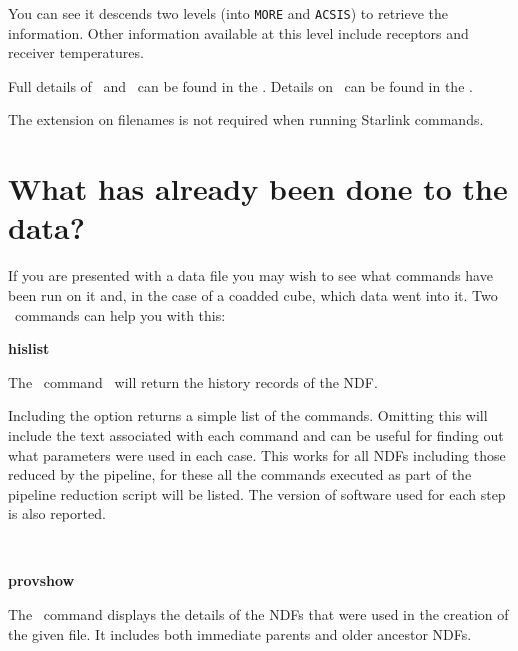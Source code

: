 \documentclass[11pt,oneside,chapters]{starlink}
\begin{document}
You can see it descends two levels (into \texttt{MORE} and
\texttt{ACSIS}) to retrieve the information. Other information
available at this level include receptors and receiver temperatures.

Full details of \ndftrace\ and \fitslist\ can be found in the
. Details on \hdstrace\ can be
found in the .

\begin{tip}
The  extension on filenames is not required when running Starlink commands.
\end{tip}


\section{What has already been done to the data?}

If you are presented with a data file you may wish to see what
commands have been run on it and, in the case of a coadded cube, which
data went into it. Two \Kappa\ commands can help you with this:
\vspace{0.7cm}\\
\begin{minipage}[t]{0.12\linewidth}
\textbf{hislist}
\end{minipage}
\begin{minipage}[t]{0.85\linewidth}The \Kappa\ command \hislist\ will return the history records of the NDF.
\begin{terminalv}
\end{terminalv}
Including the  option returns a simple list of the
commands. Omitting this will include the text associated with each
command and can be useful for finding out what parameters were used in
each case. This works for all NDFs including those reduced by the
pipeline, for these all the commands executed as part of the pipeline
reduction script will be listed. The version of software used for each
step is also reported.
\end{minipage}
\vspace{0.7cm}\\
\begin{minipage}[t]{0.12\linewidth}
\textbf{provshow}
\end{minipage}
\begin{minipage}[t]{0.85\linewidth}
The \Kappa\ command  displays the details of the NDFs
that were used in the creation of the given file. It includes both
immediate parents and older ancestor NDFs.
\begin{terminalv}
\end{terminalv}
\end{minipage}
\vspace{0.7cm}\\
\end{document}
